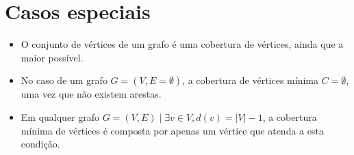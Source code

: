 \section{Casos especiais}
\label{sec:casos-especiais}

\begin{itemize}
    \item O conjunto de vértices de um grafo é uma cobertura de
    vértices, ainda que a maior possível.

    \item No caso de um grafo $G = (V, E=\emptyset)$, a cobertura de vértices
    mínima $C = \emptyset$, uma vez que não existem arestas.



    \item Em qualquer grafo $G = (V, E) \mid \exists v \in V, d(v) =
    \left| V \right| - 1$, a cobertura mínima de vértices é composta
    por apenas um vértice que atenda a esta condição.
\end{itemize}
